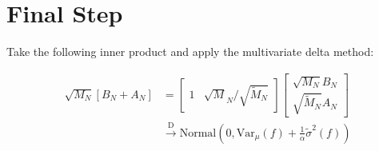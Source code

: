 \documentclass{article}
\begin{document}
\section{Final Step}

Take the following inner product and apply the multivariate delta method:

\begin{align*}
\sqrt{M_N} \left[ B_N + A_N    \right]
&= 
\begin{bmatrix}
1 & \sqrt{M}_N/\sqrt{\tilde{M}_N}
\end{bmatrix}
\begin{bmatrix}
\sqrt{M_N} B_N \\
\sqrt{\tilde{M}_N} A_N
\end{bmatrix} \\
& \overset{\text{D}}{\to}
\text{Normal}\left( 
0,
\text{Var}_{\mu}(f) + \frac{1}{\alpha} \tilde{\sigma}^2\left(f \right)
\right) 
\end{align*}
\end{document}
